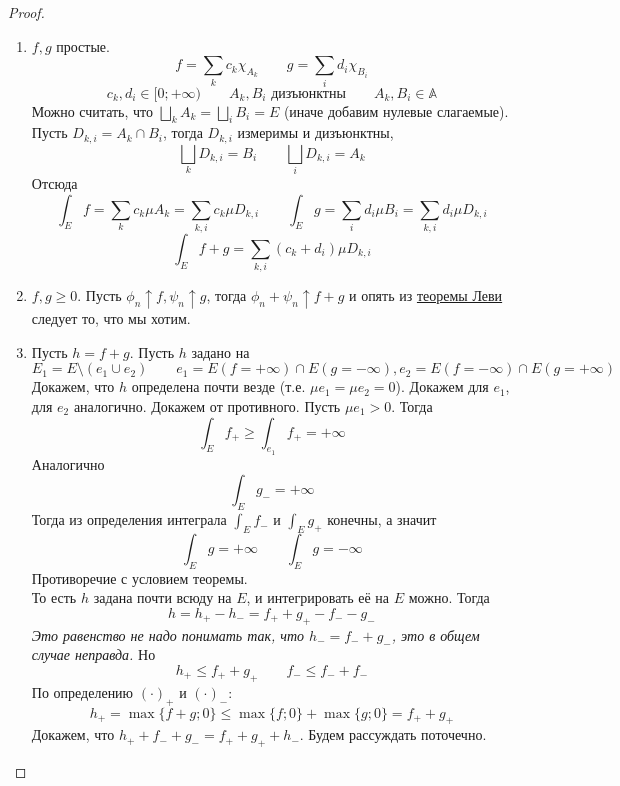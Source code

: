 \documentclass{article}
\begin{document}
    \begin{proof}
        \begin{enumerate}
            \item $f,g$ простые.
            $$
            f=\sum\limits_kc_k\chi_{A_k}\qquad g=\sum\limits_id_i\chi_{B_i}
            $$
            $$
            c_k,d_i\in[0;+\infty)\qquad A_k,B_i\text{ дизъюнктны}\qquad A_k,B_i\in\mathbb A
            $$
            Можно считать, что $\bigsqcup\limits_kA_k=\bigsqcup\limits_iB_i=E$ (иначе добавим нулевые слагаемые). Пусть $D_{k,i}=A_k\cap B_i$, тогда $D_{k,i}$ измеримы и дизъюнктны,
            $$
            \bigsqcup\limits_kD_{k,i}=B_i\qquad \bigsqcup\limits_iD_{k,i}=A_k
            $$
            Отсюда
            $$
            \int_Ef=\sum\limits_kc_k\mu A_k=\sum\limits_{k,i}c_k\mu D_{k,i}\qquad \int_Eg=\sum\limits_id_i\mu B_i=\sum\limits_{k,i}d_i\mu D_{k,i}
            $$
            $$
            \int_Ef+g=\sum\limits_{k,i}(c_k+d_i)\mu D_{k,i}
            $$
            \item $f,g\geqslant0$. Пусть $\phi_n\uparrow f,\psi_n\uparrow g$, тогда $\phi_n+\psi_n\uparrow f+g$ и опять из \hyperref[Теорема Леви]{теоремы Леви} следует то, что мы хотим.
            \item Пусть $h=f+g$. Пусть $h$ задано на
            $$
            E_1=E\setminus(e_1\cup e_2)\qquad e_1=E(f=+\infty)\cap E(g=-\infty),e_2=E(f=-\infty)\cap E(g=+\infty)
            $$
            Докажем, что $h$ определена почти везде (т.е. $\mu e_1=\mu e_2=0$). Докажем для $e_1$, для $e_2$ аналогично. Докажем от противного. Пусть $\mu e_1>0$. Тогда
            $$
            \int_E f_+\geqslant\int_{e_1}f_+=+\infty
            $$
            Аналогично
            $$
            \int_E g_-=+\infty
            $$
            Тогда из определения интеграла $\int_E f_-$ и $\int_E g_+$ конечны, а значит
            $$
            \int_E g=+\infty\qquad \int_E g=-\infty
            $$
            Противоречие с условием теоремы.\\
            То есть $h$ задана почти всюду на $E$, и интегрировать её на $E$ можно. Тогда
            $$h=h_+-h_-=f_++g_+-f_--g_-$$
            \textit{Это равенство не надо понимать так, что $h_-=f_-+g_-$, это в общем случае неправда.} Но
            $$
            h_+\leqslant f_++g_+\qquad f_-\leqslant f_-+f_-
            $$
            По определению ${(\cdot)}_+$ и ${(\cdot)}_-$:
            $$
            h_+=\max\{f+g;0\}\leqslant\max\{f;0\}+\max\{g;0\}=f_++g_+
            $$
            Докажем, что $h_++f_-+g_-=f_++g_++h_-$. Будем рассуждать поточечно.

\end{enumerate}
\end{proof}
\end{document}
